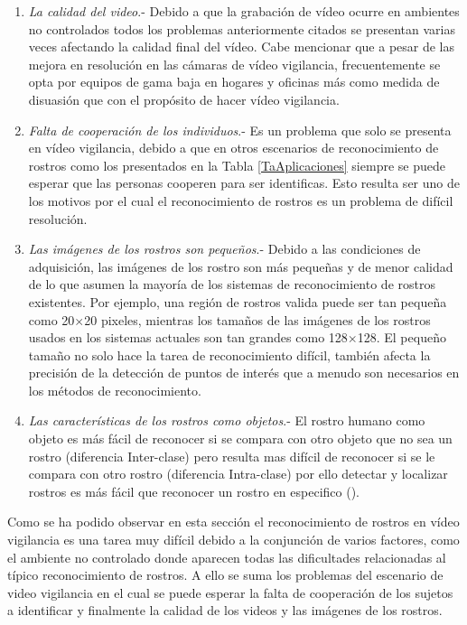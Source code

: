 \begin{enumerate}
\item \textit{La calidad del video}.- Debido a que la grabación de vídeo ocurre en ambientes no controlados todos los problemas anteriormente citados se presentan varias veces afectando la calidad final del vídeo. Cabe mencionar que a pesar de las mejora en resolución en las cámaras de vídeo vigilancia, frecuentemente se opta por equipos de gama baja en hogares y oficinas más como medida de disuasión que con el propósito de hacer vídeo vigilancia.
\item \textit{Falta de cooperación de los individuos}.- Es un problema que solo se presenta en vídeo vigilancia, debido a que en otros escenarios de reconocimiento de rostros como los presentados en la Tabla \ref{TaAplicaciones} siempre se puede esperar que las personas cooperen para ser identificas. Esto resulta ser uno de los motivos por el cual el reconocimiento de rostros es un problema de difícil resolución.
\item \textit{Las imágenes de los  rostros son pequeños}.- Debido a las condiciones de adquisición, las imágenes de los rostro son más pequeñas y de menor calidad de lo que asumen la mayoría de los sistemas de reconocimiento de rostros existentes. Por ejemplo, una región de rostros valida puede ser tan pequeña como 20$\times$20 pixeles, mientras los tamaños de las imágenes de los rostros usados en los sistemas actuales son tan grandes como 128$\times$128. El pequeño tamaño no solo hace la tarea de reconocimiento difícil, también afecta la precisión de la detección de puntos de interés que a menudo son necesarios en los métodos de reconocimiento.
\item \textit{Las características de los rostros como objetos}.- El rostro humano como objeto es más fácil de reconocer si se compara con otro objeto que no sea un rostro (diferencia Inter-clase) pero resulta mas difícil de reconocer si se le compara con otro rostro (diferencia Intra-clase) por ello detectar y localizar rostros es más fácil que reconocer un rostro en especifico (\cite{zhao2003face}). 
\end{enumerate}

Como se ha podido observar en esta sección el reconocimiento de rostros en vídeo vigilancia es una tarea muy difícil debido a la conjunción de varios factores, como el ambiente no controlado donde aparecen todas las dificultades relacionadas al típico reconocimiento de rostros. A ello se suma los problemas del escenario de video vigilancia en el cual se puede esperar la falta de cooperación de los sujetos a identificar y finalmente la calidad de los videos y las imágenes de los rostros.


